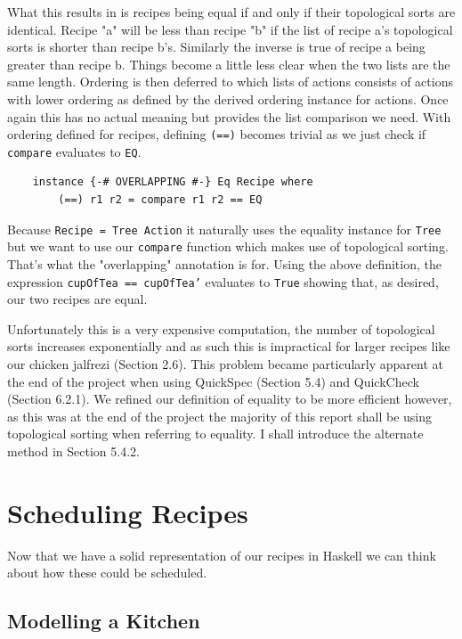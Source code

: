 \documentclass[11pt]{article}
\begin{document}
\medbreak

What this results in is recipes being equal if and only if their topological sorts are identical.
Recipe "a" will be less than recipe "b" if the list of recipe a's topological sorts is shorter than recipe b's.
Similarly the inverse is true of recipe a being greater than recipe b. Things become a little less
clear when the two lists are the same length. Ordering is then deferred to which lists of actions
consists of actions with lower ordering as defined by the derived ordering instance for actions.
Once again this has no actual meaning but provides the list comparison we need. With ordering defined for recipes,
defining \texttt{(==)} becomes trivial as we just check if \texttt{compare} evaluates to \texttt{EQ}.

\begin{lstlisting}
    instance {-# OVERLAPPING #-} Eq Recipe where
        (==) r1 r2 = compare r1 r2 == EQ
\end{lstlisting}

Because \texttt{Recipe = Tree Action} it naturally uses the equality instance for
\texttt{Tree} but we want to use our \texttt{compare} function which makes use of topological sorting.
That's what the "overlapping" annotation is for. Using the above definition, the expression
\texttt{cupOfTea == cupOfTea'} evaluates to \texttt{True} showing that, as desired, our two recipes are equal.

\medbreak

Unfortunately this is a very expensive computation, the number of topological sorts increases exponentially
and as such this is impractical for larger recipes like our chicken jalfrezi (Section 2.6). This problem
became particularly apparent at the end of the project when using QuickSpec (Section 5.4) and QuickCheck (Section 6.2.1).
We refined our definition of equality to be more efficient however, as this was at the end of the project
the majority of this report shall be using topological sorting when referring to equality. I shall introduce
the alternate method in Section 5.4.2.

\section{Scheduling Recipes}

Now that we have a solid representation of our recipes in Haskell we can think about how
these could be scheduled.

\subsection{Modelling a Kitchen}
\end{document}
